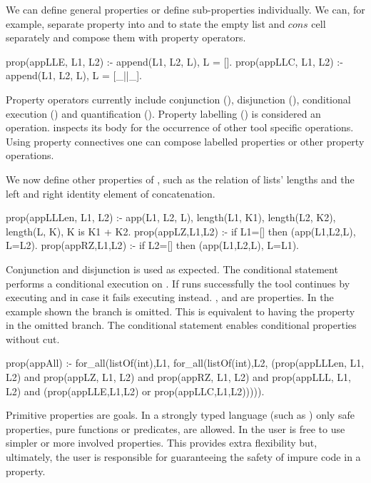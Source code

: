 We can define general properties or define sub-properties individually. 
%
We can, for example, separate property  into
 and  to state the empty list and $cons$
cell separately and compose them with property operators.
%
\begin{yapcode}
 prop({appLLE, L1, L2}) :- append(L1, L2, L), L = [].
 prop({appLLC, L1, L2}) :- append(L1, L2, L), L = [_||_].
\end{yapcode}


Property operators currently  include conjunction
 (), disjunction (), conditional
execution () and quantification
().
%
Property labelling () is considered an operation.
%
\plqc{} inspects its body for the occurrence of other tool specific
operations.
%
Using property connectives one can compose labelled properties or 
other \plqc{} property operations.




We now define other properties of , such as the relation
of lists' lengths and the left and right identity element of
concatenation.
%
\begin{yapcode}
 prop({appLLLen, L1, L2}) :- app(L1, L2, L),
   length(L1, K1), length(L2, K2), length(L, K), K is K1 + K2.
 prop({appLZ,L1,L2}) :- if L1=[] then (app(L1,L2,L), L=L2).
 prop({appRZ,L1,L2}) :- if L2=[] then (app(L1,L2,L), L=L1).
\end{yapcode}
%
Conjunction and disjunction is used as expected.
%
The conditional statement  performs a
conditional execution on . 
%
If  runs successfully the tool continues by executing  and in case it
fails executing  instead.
%
,  and  are \plqc{} properties.
%
In the example shown the  branch is omitted.
%
This is equivalent to having the property  in the omitted branch.
%
The conditional statement enables conditional properties without cut. 
%
\begin{yapcode}
 prop(appAll) :- for_all(listOf(int),L1, for_all(listOf(int),L2,
   (prop({appLLLen, L1, L2}) and prop({appLZ, L1, L2})
   and prop({appRZ, L1, L2}) and prop({appLLL, L1, L2})
   and (prop({appLLE,L1,L2}) or prop({appLLC,L1,L2}))))).
\end{yapcode}



Primitive properties are \Prolog{} goals.
%
In a strongly typed language (such as \Haskell{}) only
safe properties, pure functions or predicates, are allowed.
%
In \plqc{} the user is free to use simpler or more involved properties.
%
This provides extra flexibility but, ultimately, the user is
responsible for guaranteeing the safety of impure code in a property.

